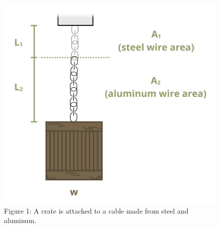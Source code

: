 \documentclass[
  letterpaper,
  DIV=11,
  numbers=noendperiod]{scrreprt}
\begin{document}
\begin{figure}[H]

{\centering \includegraphics{images/187.png}

}

\caption{Figure 1: A crate is attached to a cable made from steel and
aluminum.}

\end{figure}%
\end{document}
